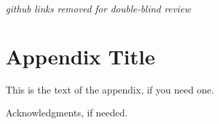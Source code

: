 \documentclass[10pt,times,numbers]{sigplanconf}
\begin{document}

{\em github links removed for double-blind review}
%




\appendix
\section{Appendix Title}

This is the text of the appendix, if you need one.

\acks

Acknowledgments, if needed.



{}
\end{document}
